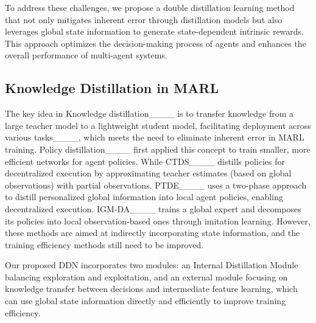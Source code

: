 To address these challenges, we propose a double distillation learning method that not only mitigates inherent error through distillation models but also leverages global state information to generate state-dependent intrinsic rewards. This approach optimizes the decision-making process of agents and enhances the overall performance of multi-agent systems.

\subsection{Knowledge Distillation in MARL}
The key idea in Knowledge distillation____ is to transfer knowledge from a large teacher model to a lightweight student model, facilitating deployment across various tasks____, which meets the need to eliminate inherent error in MARL training. Policy distillation____ first applied this concept to train smaller, more efficient networks for agent policies. While CTDS____ distills policies for decentralized execution by approximating teacher estimates (based on global observations) with partial observations. PTDE____ uses a two-phase approach to distill personalized global information into local agent policies, enabling decentralized execution. IGM-DA____ trains a global expert and decomposes its policies into local observation-based ones through imitation learning. However, these methods are aimed at indirectly incorporating state information, and the training efficiency methods still need to be improved.

Our proposed DDN incorporates two modules: an Internal Distillation Module balancing exploration and exploitation, and an external module focusing on knowledge transfer between decisions and intermediate feature learning, which can use global state information directly and efficiently to improve training efficiency.